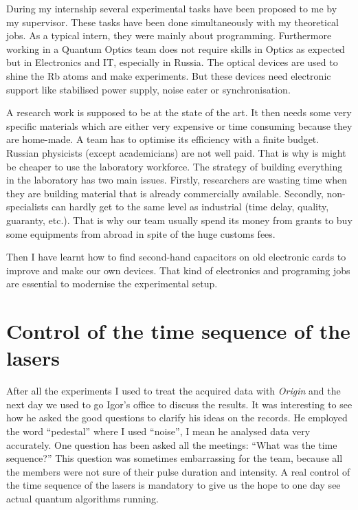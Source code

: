\documentclass[twoside, open=right
]{scrreprt}
\begin{document}
\par During my internship several experimental tasks have been proposed to me by my supervisor. These tasks have been done simultaneously with my theoretical jobs. As a typical intern, they were mainly about programming. Furthermore working in a Quantum Optics team does not require skills in Optics as expected but in Electronics and IT, especially in Russia. The optical devices are used to shine the Rb atoms and make experiments. But these devices need electronic support like stabilised power supply, noise eater or synchronisation.

\par A research work is supposed to be at the state of the art. It then needs some very specific materials which are either very expensive or time consuming because they are home-made. A team has to optimise its efficiency with a finite budget. Russian physicists (except academicians) are not well paid. That is why is might be cheaper to use the laboratory workforce. The strategy of building everything in the laboratory has two main issues. Firstly, researchers are wasting time when they are building material that is already commercially available. Secondly, non-specialists can hardly get to the same level as industrial (time delay, quality, guaranty, etc.). That is why our team usually spend its money from grants to buy some equipments from abroad in spite of the huge customs fees.

\par Then I have learnt how to find second-hand capacitors on old electronic cards to improve and make our own devices. That kind of electronics and programing jobs are essential to modernise the experimental setup.

\section{Control of the time sequence of the lasers}

\par After all the experiments I used to treat the acquired data with \emph{Origin} and the next day we used to go Igor's office to discuss the results. It was interesting to see how he asked the good questions to clarify his ideas on the records. He employed the word ``pedestal'' where I used ``noise'', I mean he analysed data very accurately. One question has been asked all the meetings: ``What was the time sequence?'' This question was sometimes embarrassing for the team, because all the members were not sure of their pulse duration and intensity. A real control of the time sequence of the lasers is mandatory to give us the hope to one day see actual quantum algorithms running.
\end{document}
